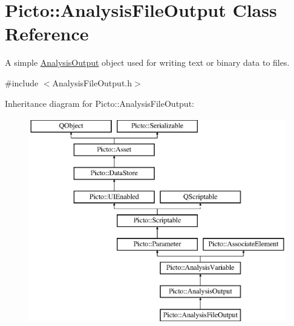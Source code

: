 \hypertarget{class_picto_1_1_analysis_file_output}{\section{Picto\-:\-:Analysis\-File\-Output Class Reference}
\label{class_picto_1_1_analysis_file_output}
}


A simple \hyperlink{class_picto_1_1_analysis_output}{Analysis\-Output} object used for writing text or binary data to files.  




{\ttfamily \#include $<$Analysis\-File\-Output.\-h$>$}

Inheritance diagram for Picto\-:\-:Analysis\-File\-Output\-:\begin{figure}[H]
\begin{center}
\leavevmode
\includegraphics[height=9.000000cm]{class_picto_1_1_analysis_file_output}
\end{center}
\end{figure}
